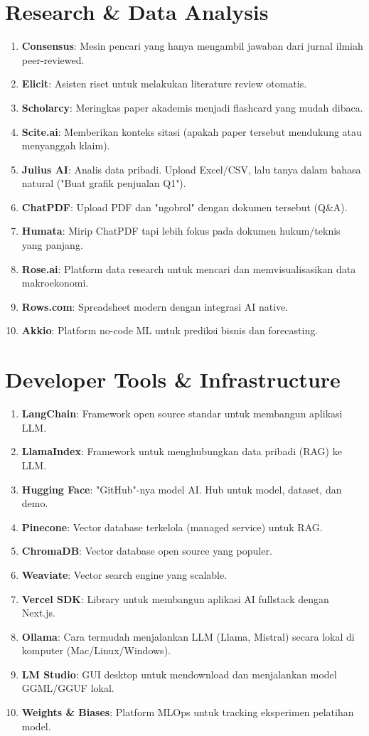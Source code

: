 \section{Research \& Data Analysis}
\begin{enumerate}
    \item \textbf{Consensus}: Mesin pencari yang hanya mengambil jawaban dari jurnal ilmiah peer-reviewed.
    \item \textbf{Elicit}: Asisten riset untuk melakukan literature review otomatis.
    \item \textbf{Scholarcy}: Meringkas paper akademis menjadi flashcard yang mudah dibaca.
    \item \textbf{Scite.ai}: Memberikan konteks sitasi (apakah paper tersebut mendukung atau menyanggah klaim).
    \item \textbf{Julius AI}: Analis data pribadi. Upload Excel/CSV, lalu tanya dalam bahasa natural ("Buat grafik penjualan Q1").
    \item \textbf{ChatPDF}: Upload PDF dan "ngobrol" dengan dokumen tersebut (Q\&A).
    \item \textbf{Humata}: Mirip ChatPDF tapi lebih fokus pada dokumen hukum/teknis yang panjang.
    \item \textbf{Rose.ai}: Platform data research untuk mencari dan memvisualisasikan data makroekonomi.
    \item \textbf{Rows.com}: Spreadsheet modern dengan integrasi AI native.
    \item \textbf{Akkio}: Platform no-code ML untuk prediksi bisnis dan forecasting.
\end{enumerate}

\section{Developer Tools \& Infrastructure}
\begin{enumerate}
    \item \textbf{LangChain}: Framework open source standar untuk membangun aplikasi LLM.
    \item \textbf{LlamaIndex}: Framework untuk menghubungkan data pribadi (RAG) ke LLM.
    \item \textbf{Hugging Face}: "GitHub"-nya model AI. Hub untuk model, dataset, dan demo.
    \item \textbf{Pinecone}: Vector database terkelola (managed service) untuk RAG.
    \item \textbf{ChromaDB}: Vector database open source yang populer.
    \item \textbf{Weaviate}: Vector search engine yang scalable.
    \item \textbf{Vercel SDK}: Library untuk membangun aplikasi AI fullstack dengan Next.js.
    \item \textbf{Ollama}: Cara termudah menjalankan LLM (Llama, Mistral) secara lokal di komputer (Mac/Linux/Windows).
    \item \textbf{LM Studio}: GUI desktop untuk mendownload dan menjalankan model GGML/GGUF lokal.
    \item \textbf{Weights \& Biases}: Platform MLOps untuk tracking eksperimen pelatihan model.
\end{enumerate}

